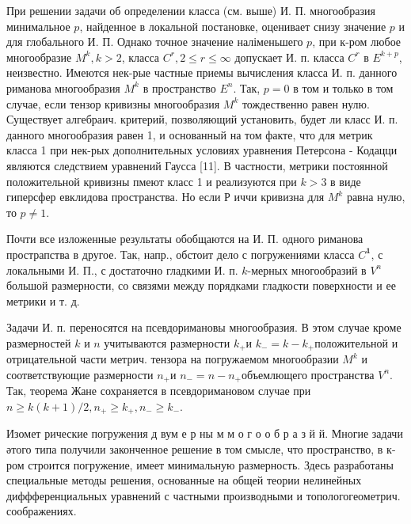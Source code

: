 \documentclass[10pt]{article}
\begin{document}
При решении задачи об определении класса (см. выше) И. П. многообразия минимальное $p$, найденное в локальной постановке, оценивает снизу значение $p$ и для глобального И. П. Однако точное значение наліменьшего $p$, при к-ром любое многообразие $M^{k}, k>2$, класса $C^{r}, 2 \leqslant r \leqslant \infty$ допускает И. п. класса $C^{r}$ в $E^{k+p}$, неизвестно. Имеются нек-рые частные приемы вычисления класса И. п. данного риманова многообразия $M^{k}$ в пространство $E^{n}$. Так, $p=0$ в том и только в том случае, если тензор кривизны многообразия $M^{k}$ тождественно равен нулю. Существует алгебраич. критерий, позволяющий установить, будет ли класс И. п. данного многообразия равен 1, и основанный на том факте, что для метрик класса 1 при нек-рых дополнительных условиях уравнения Петерсона - Кодацци являются следствием уравнений Гаусса [11]. В частности, метрики постоянной положительной кривизны пмеют класс 1 и реализуются при $k>3$ в виде гиперсфер евклидова пространства. Но если Р иччи кривизна для $M^{k}$ равна нулю, то $p \neq 1$.



Почти все изложенные результаты обобщаются на И. П. одного риманова прострапства в другое. Так, напр., обстоит дело с погружениями класса $C^{\mathbf{1}}$, с локальными И. П., с достаточно гладкими И. п. $k$-мерных многообразий в $V^{n}$ большой размерности, со связями между порядками гладкости поверхности и ее метрики и т. д.



Задачи И. п. переносятся на псевдоримановы многообразия. В этом случае кроме размерностей $k$ и $n$ учитываются размерности $k_{+}$и $k_{-}=k-k_{+}$положительной и отрицательной части метрич. тензора на погружаемом многообразии $M^{k}$ и соответствующие размерности $n_{+}$и $n_{-}=n-n_{+}$объемлющего пространства $V^{n}$. Так, теорема Жане сохраняется в псевдоримановом случае при $n \geqslant k(k+1) / 2, n_{+} \geqslant k_{+}, n_{-} \geqslant k_{-}$.



Изомет рические погружения д вум е р ны м м о г о о б р а з й й. Многие задачи әтого типа получили законченное решение в том смысле, что пространство, в к-ром строится погружение, имеет минимальную размерность. Здесь разработаны специальные методы решения, основанные на общей теории нелинейных диффференциальных уравнений с частными производными и топологогеометрич. соображениях.
\end{document}
